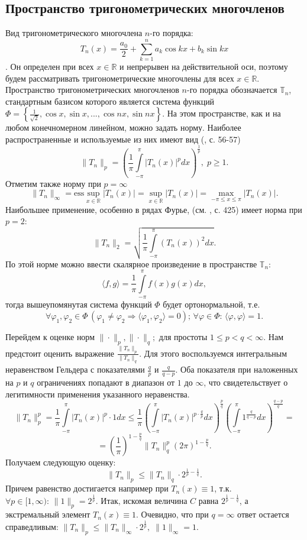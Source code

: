 \documentclass{article}
\begin{document}
\subsection{Пространство тригонометрических многочленов}
Вид тригонометрического многочлена $n$-го порядка: 
$$T_n(x) = \frac{a_0}{2} + \sum\limits_{k=1}^n {a_k\cos{kx} + b_k\sin{kx}}$$.
Он определен при всех $x \in \mathbb{R}$ и непрерывен на действительной оси, поэтому будем рассматривать тригонометрические многочлены для всех $x \in \mathbb{R}$. Пространство тригонометрических многочленов $n$-го порядка обозначается $\mathbb{T}_n$, стандартным базисом которого является система функций $\Phi = \left\{\frac{1}{\sqrt{2}},\cos{x},\sin{x},...,\cos{nx},\sin{nx}\right\}$. На этом пространстве, как и на любом конечномерном линейном, можно задать норму. Наиболее распространенные и используемые из них имеют вид (\cite{Tikhomirov}, с. 56-57)
$$ \|T_n\|_p = \left(\frac{1}{\pi}\int\limits_{-\pi}^{\pi}{|T_n(x)|^pdx} \right)^{\frac{1}{p}}, \; p \geq 1. $$
Отметим также норму при $p=\infty$
$$ \|T_n\|_{\infty} = \text{ess}\sup\limits_{x \in \mathbb{R}} {|T_n(x)|} = \sup\limits_{x \in \mathbb{R}} {|T_n(x)|} = \max\limits_{-\pi \leq x \leq \pi} {|T_n(x)|}. $$
Наибольшее применение, особенно в рядах Фурье, (см. \cite{Kolmogorov}, с. 425) имеет норма при $p = 2$:
$$ \|T_n\|_2 = \sqrt{\frac{1}{\pi}\int\limits_{-\pi}^{\pi}{(T_n(x))^2dx}}. $$
По этой норме можно ввести скалярное произведение в пространстве $\mathbb{T}_n$:
$$ \langle f, g \rangle = \frac{1}{\pi}\int\limits_{-\pi}^{\pi}{f(x)g(x)dx}, $$
тогда вышеупомянутая система функций $\Phi$ будет ортонормальной, т.е. 
$$\forall{\varphi_1,\varphi_2 \in \Phi} \, (\varphi_1 \neq \varphi_2 \Rightarrow \langle \varphi_1, \varphi_2\rangle = 0); \, \forall{\varphi \in \Phi}: \, \langle \varphi, \varphi \rangle = 1.$$

\vspace{3mm}
Перейдем к оценке норм $\|\cdot\|_p, \|\cdot\|_q; \text{ для простоты } 1 \leq p < q < \infty$. Нам предстоит оценить выражение $\frac{\|T_n\|_p}{\|T_n\|_q}$. Для этого воспользуемся интегральным неравенством Гельдера с показателями $\frac{q}{p}$ и $\frac{q}{q-p}$. Оба показателя при наложенных на $p$ и $q$ ограничениях попадают в диапазон от $1$ до $\infty$, что свидетельствует о легитимности применения указанного неравенства.
$$ \|T_n\|_p^p = \frac{1}{\pi}\int\limits_{-\pi}^{\pi}{|T_n(x)|^p \cdot 1dx} \leq \frac{1}{\pi}\left(\int\limits_{-\pi}^{\pi}{|T_n(x)|^{p\cdot\frac{q}{p}}dx}\right)^{\frac{p}{q}}\left(\int\limits_{-\pi}^{\pi}{1^{\frac{q}{q-p}}dx}\right)^{\frac{q-p}{q}} = $$
$$ = \left(\frac{1}{\pi}\right)^{1-\frac{p}{q}}\|T_n\|_q^p\left(2\pi\right)^{1-\frac{p}{q}}. $$
Получаем следующую оценку:
$$ \|T_n\|_p \leq \|T_n\|_q\cdot 2^{\frac{1}{p}-\frac{1}{q}}. $$
Причем равенство достигается например при $T_n(x) \equiv 1$, т.к. $\forall{p \in [1,\infty)}: \, \|1\|_p = 2^{\frac{1}{p}}$.
\newline
Итак, искомая величина $C$ равна $ 2^{\frac{1}{p}-\frac{1}{q}}$, а экстремальный элемент $T_n(x) \equiv 1$. Очевидно, что при $q=\infty$ ответ остается справедливым: $\|T_n\|_p \leq \|T_n\|_{\infty} \cdot 2^{\frac{1}{p}}, \; \|1\|_{\infty} = 1$.
\end{document}
